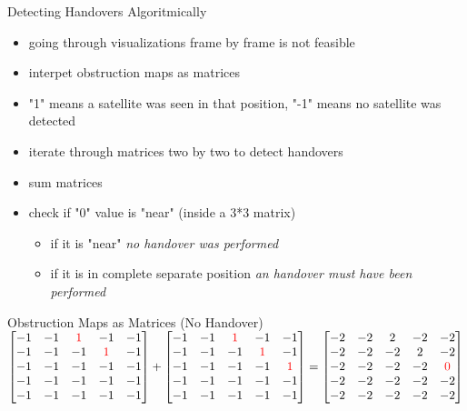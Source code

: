 \documentclass[NET,english,beameralt]{tumbeamer}
\begin{document}
\begin{frame}{Detecting Handovers Algoritmically}
    \begin{itemize}
        \item going through visualizations frame by frame is not feasible
        \item interpet obstruction maps as matrices 
        \item "1" means a satellite was seen in that position, "-1" means no satellite was detected
        \item iterate through matrices two by two to detect handovers 
        \item sum matrices
        \item check if "0" value is "near" (inside a 3*3 matrix)
            \begin{itemize}
                \item if it is "near" \emph{no handover was performed}
                \item if it is in complete separate position \emph{an handover must have been performed}
            \end{itemize}
    \end{itemize}
\end{frame}

\begin{frame}{Obstruction Maps as Matrices (No Handover)}
    $\begin{bmatrix}
        -1 & -1 & \color{red}1 &           -1 & -1 \\
        -1 & -1 &           -1 & \color{red}1 & -1 \\
        -1 & -1 &           -1 &           -1 & -1 \\
        -1 & -1 &           -1 &           -1 & -1 \\
        -1 & -1 &           -1 &           -1 & -1 \\ 
        \end{bmatrix}
        +
        \begin{bmatrix}
        -1 & -1 & \color{red}1 &           -1 &           -1 \\
        -1 & -1 &           -1 & \color{red}1 &           -1 \\
        -1 & -1 &           -1 &           -1 & \color{red}1 \\
        -1 & -1 &           -1 &           -1 &           -1 \\
        -1 & -1 &           -1 &           -1 &           -1 \\
        \end{bmatrix}
        =
        \begin{bmatrix}
        -2 & -2 & 2 &  -2 &           -2 \\
        -2 & -2 & -2 &  2 &           -2 \\
        -2 & -2 & -2 & -2 & \color{red}0 \\
        -2 & -2 & -2 & -2 &            -2 \\
        -2 & -2 & -2 & -2 &            -2 \\
    \end{bmatrix}$
\end{frame}
\end{document}
